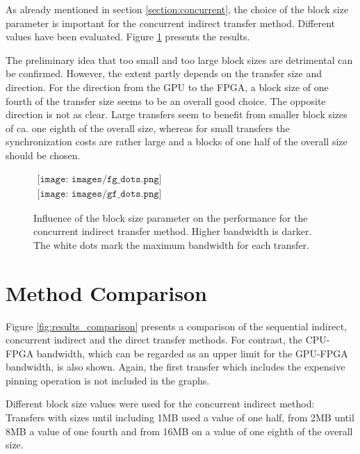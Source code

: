 As already mentioned in section \ref{section:concurrent}, the choice of the block size parameter is important for the concurrent indirect transfer method.
Different values have been evaluated. Figure \ref{fig:results_blocksizes} presents the results.

The preliminary idea that too small and too large block sizes are detrimental can be confirmed.
However, the extent partly depends on the transfer size and direction.
For the direction from the GPU to the FPGA, a block size of one fourth of the transfer size seems to be an overall good choice.
The opposite direction is not as clear.
Large transfers seem to benefit from smaller block sizes of ca. one eighth of the overall size, whereas for small transfers the synchronization costs are rather large and a blocks of one half of the overall size should be chosen.


\begin{figure}[h]
\begin{center}$
\begin{array}{cc}
\texttt{[image: images/fg\_dots.png]} \\
\texttt{[image: images/gf\_dots.png]}
\end{array}$
\end{center}
\caption{Influence of the block size parameter on the performance for the concurrent indirect transfer method. Higher bandwidth is darker. The white dots mark the maximum bandwidth for each transfer.}
\label{fig:results_blocksizes}
\end{figure}





\section{Method Comparison}

Figure \ref{fig:results_comparison} presents a comparison of the sequential indirect, concurrent indirect and the direct transfer methods.
For contrast, the CPU-FPGA bandwidth, which can be regarded as an upper limit for the GPU-FPGA bandwidth, is also shown.
Again, the first transfer which includes the expensive pinning operation is not included in the graphs.

Different block size values were used for the concurrent indirect method:
Transfers with sizes until including 1MB used a value of one half, from 2MB until 8MB a value of one fourth and from 16MB on a value of one eighth  of the overall size.

